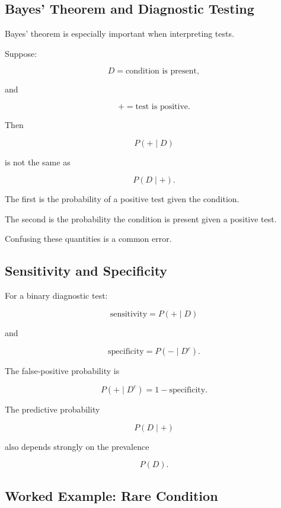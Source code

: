 \subsection{Bayes' Theorem and Diagnostic Testing}
\label{subsec:bayes-diagnostic-testing}

Bayes' theorem is especially important when interpreting tests.

Suppose:

\[
D
=
\text{condition is present},
\]

and

\[
+
=
\text{test is positive}.
\]

Then

\[
P(+\mid D)
\]

is not the same as

\[
P(D\mid +).
\]

The first is the probability of a positive test given the condition.

The second is the probability the condition is present given a positive
test.

Confusing these quantities is a common error.

\subsection{Sensitivity and Specificity}
\label{subsec:sensitivity-specificity}

For a binary diagnostic test:

\[
\boxed{
\text{sensitivity}
=
P(+\mid D)
}
\]

and

\[
\boxed{
\text{specificity}
=
P(-\mid D^c).
}
\]

The false-positive probability is

\[
\boxed{
P(+\mid D^c)
=
1-\text{specificity}.
}
\]

The predictive probability

\[
P(D\mid+)
\]

also depends strongly on the prevalence

\[
P(D).
\]

\subsection{Worked Example: Rare Condition}
\label{subsec:worked-rare-condition}

